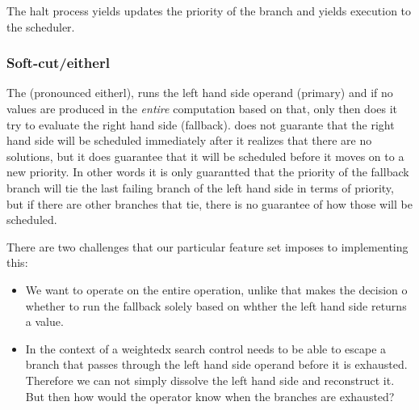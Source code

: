 \begin{code}
\caption{\label{orge4516d6}The halt process yields updates the priority of the branch and yields execution to the scheduler.}
\end{code}


\subsubsection{Soft-cut/eitherl}
\label{sec:orgba03e8f}
The \hask{<//>} (pronounced eitherl),  runs the left hand
side operand (primary) and if no values are produced in the \emph{entire}
computation based on that, only then does it try to evaluate the right
hand side (fallback).  does not guarante that the right hand
side will be scheduled immediately after it realizes that there are no
solutions, but it does guarantee that it will be scheduled before it
moves on to a new priority. In other words it is only guarantted that
the priority of the fallback branch will tie the last failing branch
of the left hand side in terms of priority, but if there are other
branches that tie, there is no guarantee of how those will be
scheduled.

There are two challenges that our particular feature set imposes to
implementing this:

\begin{itemize}
\item We want \hask{<//>} to operate on the entire operation, unlike
\cite{kiselyovBacktrackingInterleavingTerminating} that makes the
decision o whether to run the fallback solely based on whther the
left hand side returns a value.
\item In the context of a weightedx search control needs to be able to
escape a branch that passes through the left hand side operand
before it is exhausted. Therefore we can not simply dissolve the
left hand side and reconstruct it. But then how would the operator
know when the branches are exhausted?
\end{itemize}


